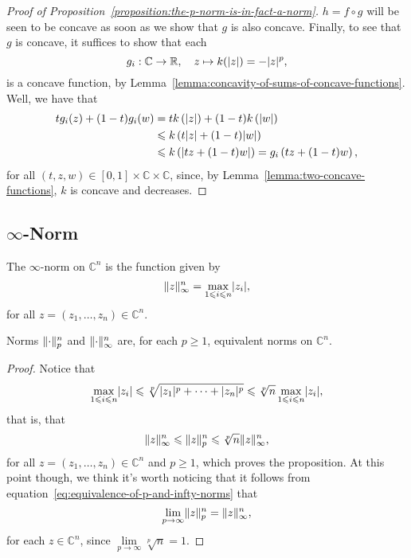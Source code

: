 \begin{proof}[Proof of Proposition~\ref{proposition:the-p-norm-is-in-fact-a-norm}]
  \(h=f\circ{g}\) will be seen to be concave as soon as we show that \(g\) is
  also concave. Finally, to see that \(g\) is concave, it suffices to show that
  each
  \[
    g_{i}:\mathbb{C}\to\mathbb{R},\quad{z\mapsto{k(\lvert z\rvert)=-\lvert z\rvert^{p}}},
  \]
  is a concave function, by
  Lemma~\ref{lemma:concavity-of-sums-of-concave-functions}. Well, we have that
  \begin{align*}
    tg_{i}(z)+(1-t)g_{i}(w)
    &=
    tk\left(\lvert z\rvert\right)+(1-t)k\left(\lvert w\rvert\right)
    \\
    &\leqslant
    k\left(t\lvert z\rvert+(1-t)\lvert w\rvert\right)
    \\
    &\leqslant
    k\left(\lvert tz+(1-t)w\rvert\right)
    =
    g_{i}\left(tz+(1-t)w\right),
  \end{align*}
  for all \((t,z,w)\in{[0,1]\times\mathbb{C}\times\mathbb{C}}\), since,
  by Lemma~\ref{lemma:two-concave-functions}, \(k\) is concave and decreases.
\end{proof}

\subsection{\(\infty\)-Norm}\label{subsec:infty-norm}

\begin{definition}
  The \(\infty\)-norm on \(\mathbb{C}^{n}\) is the function given by
  \[
    \lVert z\rVert^{n}_{\infty}
    =
    \max\limits_{1\leqslant{i}\leqslant{n}}\lvert z_{i}\rvert,
  \]
  for all \(z=(z_{1},\ldots,z_{n})\in\mathbb{C}^{n}\).
\end{definition}

\begin{proposition}
  Norms \(\lVert\cdot\rVert^{n}_{p}\) and \(\lVert\cdot\rVert^{n}_{\infty}\) are, for
  each \(p\geqslant{1}\), equivalent norms on \(\mathbb{C}^{n}\).
\end{proposition}

\begin{proof}
  Notice that
  \[
    \max\limits_{1\leqslant{i}\leqslant{n}}\lvert z_{i}\rvert
    \leqslant\sqrt[p]{\lvert z_{1}\rvert^{p}+\cdots+\lvert z_{n}\rvert^{p}}
    \leqslant\sqrt[p]{n}\max\limits_{1\leqslant{i}\leqslant{n}}\lvert z_{i}\rvert,
  \]
  that is, that
  \begin{equation}\label{eq:equivalence-of-p-and-infty-norms}
    \lVert z\rVert^{n}_{\infty}
    \leqslant
    \lVert z\rVert^{n}_{p}
    \leqslant
    \sqrt[p]{n}\lVert z\rVert^{n}_{\infty},
  \end{equation}
  for all \(z=(z_{1},\ldots,z_{n})\in\mathbb{C}^{n}\) and \(p\geqslant{1}\),
  which proves the proposition. At this point though, we think it's worth
  noticing that it follows from
  equation~\eqref{eq:equivalence-of-p-and-infty-norms} that
  \[
    \lim\limits_{p\to\infty}\lVert z\rVert^{n}_{p}=\lVert z\rVert^{n}_{\infty},
  \]
  for each \(z\in\mathbb{C}^{n}\), since
  \(\lim\limits_{p\to\infty}\sqrt[p]{n}=1\).
\end{proof}
